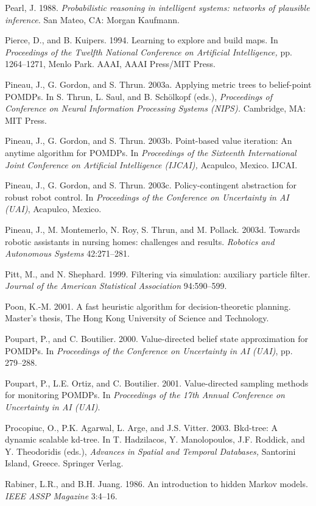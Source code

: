\documentclass[10pt,a4paper]{article}
\begin{document}
Pearl, J. 1988. \textit{Probabilistic reasoning in intelligent systems: networks of plausible inference.}
San Mateo, CA: Morgan Kaufmann.

Pierce, D., and B. Kuipers. 1994. Learning to explore and build maps. In \textit{Proceedings of
the Twelfth National Conference on Artificial Intelligence,} pp. 1264–1271, Menlo Park.
AAAI, AAAI Press/MIT Press.

Pineau, J., G. Gordon, and S. Thrun. 2003a. Applying metric trees to belief-point
POMDPs. In S. Thrun, L. Saul, and B. Schölkopf (eds.), \textit{Proceedings of Conference on
Neural Information Processing Systems (NIPS).} Cambridge, MA: MIT Press.

Pineau, J., G. Gordon, and S. Thrun. 2003b. Point-based value iteration: An anytime
algorithm for POMDPs. In \textit{Proceedings of the Sixteenth International Joint Conference
on Artificial Intelligence (IJCAI),} Acapulco, Mexico. IJCAI.

Pineau, J., G. Gordon, and S. Thrun. 2003c. Policy-contingent abstraction for robust
robot control. In \textit{Proceedings of the Conference on Uncertainty in AI (UAI)}, Acapulco,
Mexico.

Pineau, J., M. Montemerlo, N. Roy, S. Thrun, and M. Pollack. 2003d. Towards robotic
assistants in nursing homes: challenges and results. \textit{Robotics and Autonomous Systems}
42:271–281.

Pitt, M., and N. Shephard. 1999. Filtering via simulation: auxiliary particle filter.
\textit{Journal of the American Statistical Association} 94:590–599.

Poon, K.-M. 2001. A fast heuristic algorithm for decision-theoretic planning. Master’s
thesis, The Hong Kong University of Science and Technology.

Poupart, P., and C. Boutilier. 2000. Value-directed belief state approximation for
POMDPs. In \textit{Proceedings of the Conference on Uncertainty in AI (UAI)}, pp. 279–288.

Poupart, P., L.E. Ortiz, and C. Boutilier. 2001. Value-directed sampling methods for
monitoring POMDPs. In \textit{Proceedings of the 17th Annual Conference on Uncertainty in
AI (UAI)}.

Procopiuc, O., P.K. Agarwal, L. Arge, and J.S. Vitter. 2003. Bkd-tree: A dynamic scalable
kd-tree. In T. Hadzilacos, Y. Manolopoulos, J.F. Roddick, and Y. Theodoridis
(eds.), \textit{Advances in Spatial and Temporal Databases,} Santorini Island, Greece. Springer
Verlag.

Rabiner, L.R., and B.H. Juang. 1986. An introduction to hidden Markov models. \textit{IEEE
ASSP Magazine} 3:4–16.
\end{document}
